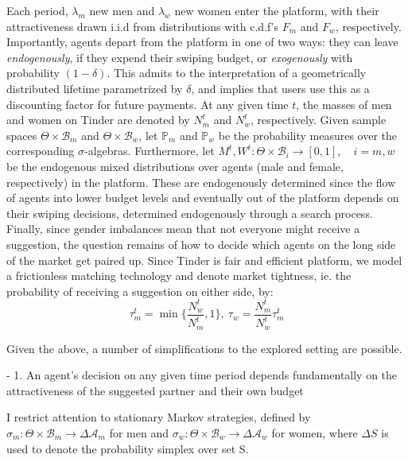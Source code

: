 Each period, $\lambda_m$ new men and $\lambda_w$ new women enter the platform, with their attractiveness drawn i.i.d from distributions with c.d.f’s $F_m$ and $F_w$, respectively. Importantly, agents depart from the platform in one of two ways: they can leave \textit{endogenously}, if they expend their swiping budget, or \textit{exogenously} with probability $(1-\delta)$. This admits to the interpretation of a geometrically distributed lifetime parametrized by $\delta$, and implies that users use this as a discounting factor for future payments. At any given time $t$, the masses of men and women on Tinder are denoted by $N^t_{m}$ and $N^t_{w}$, respectively. Given sample spaces $\Theta \times \mathcal{B}_{m}$ and $\Theta \times \mathcal{B}_{w}$, let $\mathbb{P}_{m}$ and $\mathbb{P}_{w}$ be the probability measures over the corresponding $\sigma$-algebras. Furthermore, let $M^t,W^t:\Theta\times\mathcal{B}_{i}\rightarrow[0,1], \quad i=m,w$ be the endogenous mixed distributions over agents (male and female, respectively) in the platform. These are endogenously determined since the flow of agents into lower budget levels and eventually out of the platform depends on their swiping decisions, determined endogenously through a search process. Finally, since gender imbalances mean that not everyone might receive a suggestion, the question remains of how to decide which agents on the long side of the market get paired up. Since Tinder is fair and efficient platform, we model a frictionless matching technology and denote market tightness, ie. the probability of receiving a suggestion on either side, by:
$$
\tau^t_m=\min\{\frac{N^t_w}{N^t_m} ,1\}, \ \tau_w= \frac{N^t_m}{N^t_w}\tau^t_m
$$


Given the above, a number of simplifications to the explored setting are possible. 

- 1. An agent’s decision on any given time period depends fundamentally on the attractiveness of the suggested partner and their own budget

I restrict attention to stationary Markov strategies, defined by $\sigma_m: \Theta \times\mathcal{B}_m\rightarrow \Delta\mathcal{A}_m$ for men and $\sigma_w:\Theta \times\mathcal{B}_w\rightarrow \Delta\mathcal{A}_w$ for women, where $\Delta S$ is used to denote the probability simplex over set S. 


